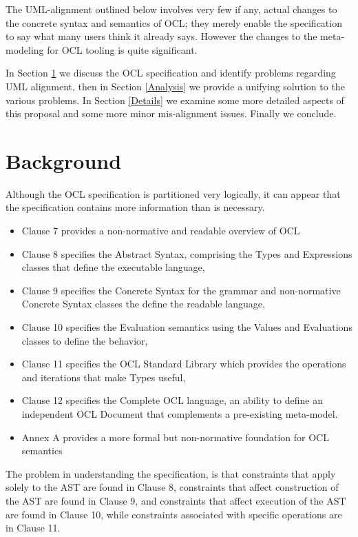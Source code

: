 \documentclass{eceasst}
\begin{document}
The UML-alignment outlined below involves very few if any, actual changes to the concrete syntax and semantics of OCL; they merely enable the specification to say what many users think it already says. However the changes to the meta-modeling for OCL tooling is quite significant.

In Section \ref{Background} we discuss the OCL specification and identify problems regarding UML alignment, then in Section \ref{Analysis} we provide a unifying solution to the various problems. In Section \ref{Details} we examine some more detailed aspects of this proposal and some more minor mis-alignment issues. Finally we conclude. 

\section{Background}\label{Background}

Although the OCL specification is partitioned very logically, it can appear that the specification contains more information than is necessary.

\begin{itemize}
\item Clause 7 provides a non-normative and readable overview of OCL
\item Clause 8 specifies the Abstract Syntax, comprising the Types and Expressions classes that define the executable language, 
\item Clause 9 specifies the Concrete Syntax for the grammar and non-normative Concrete Syntax classes the define the readable language, 
\item Clause 10 specifies the Evaluation semantics using the Values and Evaluations classes to define the behavior, 
\item Clause 11 specifies the OCL Standard Library which provides the operations and iterations that make Types useful, 
\item Clause 12 specifies the Complete OCL language, an ability to define an independent OCL Document that complements a pre-existing meta-model.
\item Annex A provides a more formal but non-normative foundation for OCL semantics
\end{itemize}

The problem in understanding the specification, is that constraints that apply solely to the AST are found in Clause 8, constraints that affect construction of the AST are found in Clause 9, and constraints that affect execution of the AST are found in Clause 10, while constraints associated with specific operations are in Clause 11.
\end{document}
